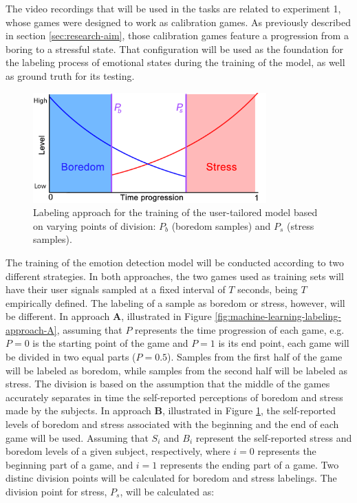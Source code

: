 The video recordings that will be used in the tasks are related to experiment 1, whose games were designed to work as calibration games. As previously described in section \ref{sec:research-aim}, those calibration games feature a progression from a boring to a stressful state. That configuration will be used as the foundation for the labeling process of emotional states during the training of the model, as well as ground truth for its testing.

\begin{figure}[h]
    \centering
    \includegraphics[width=0.8\textwidth]{figures/machine-learning-labeling-approach-B.png}
    \caption{Labeling approach for the training of the user-tailored model based on varying points of division: $P_b$ (boredom samples) and $P_s$ (stress samples).}
    \label{fig:machine-learning-labeling-approach-B}
\end{figure}

The training of the emotion detection model will be conducted according to two different strategies. In both approaches, the two games used as training sets will have their user signals sampled at a fixed interval of $T$ seconds, being $T$ empirically defined. The labeling of a sample as boredom or stress, however, will be different. In approach \textbf{A}, illustrated in Figure \ref{fig:machine-learning-labeling-approach-A}, assuming that $P$ represents the time progression of each game, e.g. $P=0$ is the starting point of the game and $P=1$ is its end point, each game will be divided in two equal parts ($P=0.5$). Samples from the first half of the game will be labeled as boredom, while samples from the second half will be labeled as stress. The division is based on the assumption that the middle of the games accurately separates in time the self-reported perceptions of boredom and stress made by the subjects. In approach \textbf{B}, illustrated in Figure \ref{fig:machine-learning-labeling-approach-B}, the self-reported levels of boredom and stress associated with the beginning and the end of each game will be used. Assuming that $S_i$ and $B_i$ represent the self-reported stress and boredom levels of a given subject, respectively, where $i=0$ represents the beginning part of a game, and $i=1$ represents the ending part of a game. Two distinc division points will be calculated for boredom and stress labelings. The division point for stress, $P_s$, will be calculated as:


